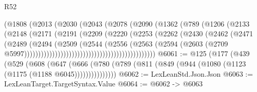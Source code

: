 \begin{lexlean}{R52}
\begin{coremodule}
                                        (@1808
                                          (@2013
                                            (@2030
                                              (@2043
                                                (@2078
                                                  (@2090
                                                    (@1362
                                                      (@789
                                                        (@1206
                                                          (@2133
                                                            (@2148
                                                              (@2171
                                                                (@2191
                                                                  (@2209
                                                                    (@2220
                                                                      (@2253
                                                                        (@2262
                                                                          (@2430
                                                                            (@2462
                                                                              (@2471
                                                                                (@2489
                                                                                  (@2494
                                                                                    (@2509
                                                                                      (@2544
                                                                                        (@2556
                                                                                          (@2563
                                                                                            (@2594
                                                                                              (@2603
                                                                                                (@2709
                                                                                                  @5997)))))))))))))))))))))))))))))))))))))))))))))))
@6061 := @125
    (@177
      (@439
        (@529
          (@608
            (@647
              (@666 (@780 (@789 (@811 (@849 (@944 (@1080 (@1123 (@1175 (@1188 @6045)))))))))))))))
@6062 := LexLeanStd.Json.Json
@6063 := LexLeanTarget.TargetSyntax.Value
@6064 := @6062 -> @6063

\end{coremodule}
\end{lexlean}
